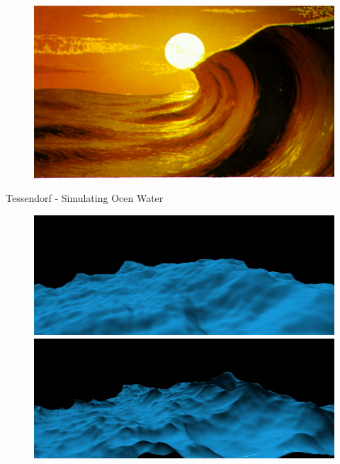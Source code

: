 \begin{figure}
{ }
 \hfill
 \subtop
 {
  \includegraphics[scale=0.25]{figures/A_Simple_Model_of_Ocean_Waves_-_Fournier_1986-013.png}
	}
\end{figure}


Tessendorf - Simulating Ocen Water \cite{course:simulatingocean}

\begin{figure}
 \centering
 \subtop
 {
  \includegraphics[scale=0.125]{figures/Simulating_Ocean_Water-012.png}
 }
 \subtop
 {
  \includegraphics[scale=0.125]{figures/Simulating_Ocean_Water-013.png}
 }
\end{figure}

